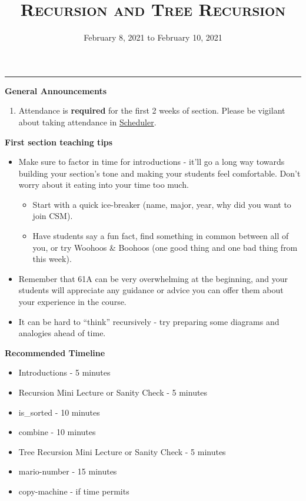 \documentclass{exam}
\title{\textsc{Recursion and Tree Recursion}}
\date{February 8, 2021 to February 10, 2021}
\begin{document}
\maketitle
\rule{\textwidth}{0.15em}
\fontsize{12}{15}\selectfont

\begin{guide}
\textbf{General Announcements}
\begin{enumerate}
    \item Attendance is \textbf{required} for the first 2 weeks of section. Please be vigilant about taking attendance in \href{https://scheduler.csmentors.org/}{Scheduler}.
\end{enumerate}
\end{guide}

\begin{guide}
\textbf{First section teaching tips}
\begin{itemize}
    \item Make sure to factor in time for introductions - it’ll go a long way towards building your section’s tone and making your students feel comfortable. Don’t worry about it eating into your time too much.
    \begin{itemize}
        \item Start with a quick ice-breaker (name, major, year, why did you want to join CSM).
        \item Have students say a fun fact, find something in common between all of you, or try Woohoos \& Boohoos (one good thing and one bad thing from this week).
    \end{itemize}
    \item Remember that 61A can be very overwhelming at the beginning, and your students will appreciate any guidance or advice you can offer them about your experience in the course. 
    \item It can be hard to ``think'' recursively - try preparing some diagrams and analogies ahead of time.
\end{itemize}
\end{guide}

\begin{guide}
\textbf{Recommended Timeline}
\begin{itemize}
    \item Introductions - 5 minutes
    \item Recursion Mini Lecture or Sanity Check - 5 minutes
    \item is\_sorted - 10 minutes
    \item combine - 10 minutes
    \item Tree Recursion Mini Lecture or Sanity Check - 5 minutes
    \item mario-number - 15 minutes
    \item copy-machine - if time permits
\end{itemize}
\end{guide}
\end{document}
